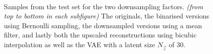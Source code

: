\begin{figure}
    \centering
    \\
    \caption{
        Samples from the test set for the two downsampling factors.
        \emph{(from top to bottom in each subfigure)}
        The originals,
        the binarised versions using Bernoulli sampling,
        the downsampled versions using a mean filter, and lastly
        both the upscaled reconstructions using bicubic interpolation as well as the VAE with a latent size $N_{\vec{z}}$ of 30.
    }
    \label{fig:samples}
\end{figure}
